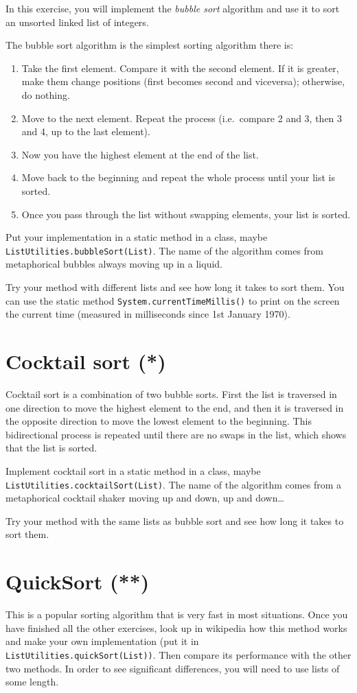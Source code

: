 \documentclass{article}
\begin{document}
In this exercise, you will implement the \emph{bubble sort} algorithm
and use it to sort an unsorted linked list of integers. 

The bubble sort algorithm is the simplest sorting algorithm there is: 

\begin{enumerate}
\item Take the first element. Compare it with the second element. If
  it is greater, make them change positions (first becomes second and
  viceversa); otherwise, do nothing.
\item Move to the next element. Repeat the process (i.e.~compare 2 and
  3, then 3 and 4, up to the last element).
\item Now you have the highest element at the end of the list.
\item Move back to the beginning and repeat the whole process until
  your list is sorted.
\item Once you pass through the list without swapping elements, your
  list is sorted. 
\end{enumerate}

Put your implementation in a static method in a class, maybe
\verb+ListUtilities.bubbleSort(List)+. The name of the algorithm comes
from metaphorical bubbles always moving up in a liquid. 

Try your method with different lists and see how long it takes to sort
them. You can use the static method \verb+System.currentTimeMillis()+
to print on the screen the current time (measured in milliseconds
since 1st January 1970). 

\section{Cocktail sort (*)}
\label{sec:cocktail-sort}

Cocktail sort is a combination of two bubble sorts. First the list is
traversed in one direction to move the highest element to the end, and
then it is traversed in the opposite direction to move the lowest
element to the beginning. This bidirectional process is repeated until
there are no swaps in the list, which shows that the list is sorted. 

Implement cocktail sort in a static method in a class, maybe
\verb+ListUtilities.cocktailSort(List)+. The name of the algorithm comes
from a metaphorical cocktail shaker moving up and down, up and
down\ldots 

Try your method with the same lists as bubble sort 
and see how long it takes to sort them. 

\section{QuickSort (**)}
\label{sec:quicksort-}

This is a popular sorting algorithm that is very fast in most
situations. Once you have finished all the other exercises, look up in
wikipedia how this method works and make your own implementation (put
it in \verb+ListUtilities.quickSort(List))+. Then compare its
performance with the other two methods. In order to see significant
differences, you will need to use lists of some length. 
\end{document}
